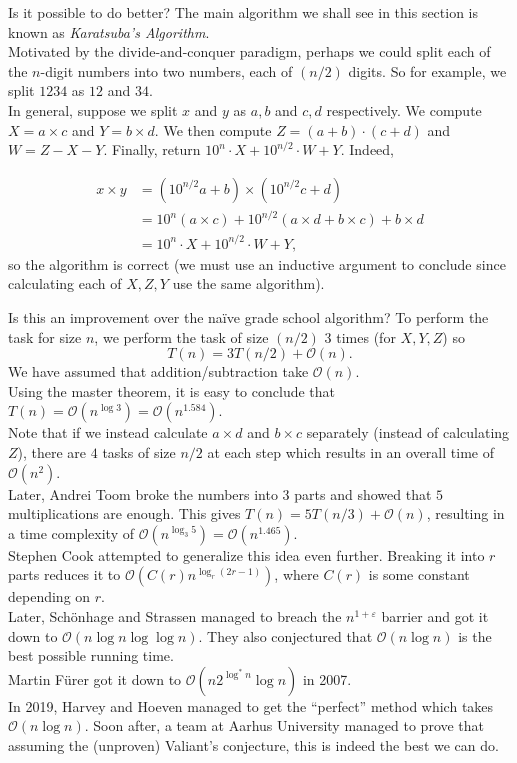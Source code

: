 Is it possible to do better? The main algorithm we shall see in this section is known as \textit{Karatsuba's Algorithm}.\\
Motivated by the divide-and-conquer paradigm, perhaps we could split each of the $n$-digit numbers into two numbers, each of $(n/2)$ digits. So for example, we split $1234$ as $12$ and $34$.\\
In general, suppose we split $x$ and $y$ as $a,b$ and $c,d$ respectively. We compute $X=a\times c$ and $Y=b\times d$. We then compute $Z=(a+b)\cdot(c+d)$ and $W=Z-X-Y$. Finally, return $10^n\cdot X + 10^{n/2}\cdot W + Y$. Indeed,

\begin{align*}
	x\times y &= (10^{n/2}a+b)\times(10^{n/2}c+d) \\
		&= 10^n (a\times c) + 10^{n/2} (a\times d+b\times c) + b\times d \\
		&= 10^n\cdot X + 10^{n/2}\cdot W + Y,
\end{align*}
so the algorithm is correct (we must use an inductive argument to conclude since calculating each of $X, Z, Y$ use the same algorithm).

Is this an improvement over the na\"ive grade school algorithm? To perform the task for size $n$, we perform the task of size $(n/2)$ $3$ times (for $X, Y, Z$) so
\[ T(n) = 3 T(n/2) + \mathcal{O}(n). \]
We have assumed that addition/subtraction take $\mathcal{O}(n)$.\\
Using the master theorem, it is easy to conclude that $T(n)=\mathcal{O}(n^{\log 3}) = \mathcal{O}(n^{1.584})$.\\ Note that if we instead calculate $a\times d$ and $b\times c$ separately (instead of calculating $Z$), there are $4$ tasks of size $n/2$ at each step which results in an overall time of $\mathcal{O}(n^2)$.\\

Later, Andrei Toom broke the numbers into $3$ parts and showed that $5$ multiplications are enough. This gives $T(n)=5T(n/3)+\mathcal{O}(n)$, resulting in a time complexity of $\mathcal{O}(n^{\log_3 5}) = \mathcal{O}(n^{1.465})$.\\

Stephen Cook attempted to generalize this idea even further. Breaking it into $r$ parts reduces it to $\mathcal{O}(C(r)n^{\log_r(2r-1)})$, where $C(r)$ is some constant depending on $r$.\\
Later, Sch\"onhage and Strassen managed to breach the $n^{1+\varepsilon}$ barrier and got it down to $\mathcal{O}(n \log n \log\log n)$. They also conjectured that $\mathcal{O}(n\log n)$ is the best possible running time.\\
Martin F\"urer got it down to $\mathcal{O}(n2^{\log^* n}\log n )$ in 2007.\\
In 2019, Harvey and Hoeven managed to get the ``perfect'' method which takes $\mathcal{O}(n\log n)$. Soon after, a team at Aarhus University managed to prove that assuming the (unproven) Valiant's conjecture, this is indeed the best we can do.

